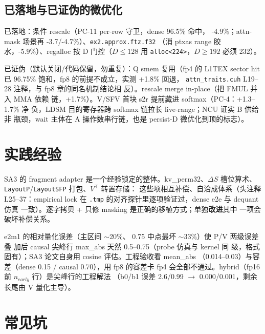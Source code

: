 \subsection{已落地与已证伪的微优化}

已落地：条件 rescale（PC-11 per-row 守卫，dense 96.5\% 命中，
-4.9\%；attn-mask 场景再 -3.7/-4.7\%）、\texttt{ex2.approx.ftz.f32}
（消 ptxas range 胶水，-5.9\%）、regalloc 按 D 门控（$D\le128$ 用
\texttt{alloc<224>}，$D\ge192$ 必须 232）。

已证伪（默认关闭/代码保留，勿重复）：Q smem 复用（fp4 的 L1TEX
sector hit 已 96.75\% 饱和，fp8 的前提不成立，实测 +1.8\% 回退，
\texttt{attn\_traits.cuh} L19--28 注释，与 fp8 章的同名机制结论相
反）。rescale merge in-place（把 FMUL 并入 MMA 依赖
链，+1.7\%）。V/SFV 首块 s2r 提前藏进 softmax（PC-4：+1.3--1.7\% 净
负，LDSM 目的寄存器跨 softmax 链拉长 live-range；NCU 证实 B 供给非
瓶颈，wait 主体在 A 操作数串行链，也是 persist-D 微优化到顶的标志）。

\section{实践经验}

SA3 的 fragment adapter 是一个经验锁定的整体。kv\_perm32、$\Delta S$
槽位算术、\texttt{LayoutP}/\texttt{LayoutSFP} 打包、$V^\top$ 转置存储：
这些项相互补偿、自洽成体系（头注释 L25--37：empirical
lock 在 \texttt{.tmp} 的对齐探针里逐项验证过，dense e2e 与 dequant 仿真
一致）。逐字拷贝 + 只修 masking 是正确的移植方式；单独\textbf{改进}其中
一项会破坏补偿关系。

e2m1 的相对量化误差（主区间 $\sim$20\%、
0.75 中点最坏 $\sim$33\%）使 P/V 两级误差叠
加后 causal 尖峰行 max\_abs 天然 0.5--0.75（probe 仿真与 kernel 同
级，格式固有）；SA3 论文自身用 cosine 评估。工程验收看 mean\_abs
（0.014--0.03）与容差（dense 0.15 / causal 0.70），用 fp8 的容差卡
fp4 会全部不通过。hybrid（fp16 前 $n_{early}$ 行）是尖峰行的工程解法
（b0/b1 误差 2.6/0.99 $\to$ 0.000/0.001，剩余长尾由 V 量化主导）。

\section{常见坑}

